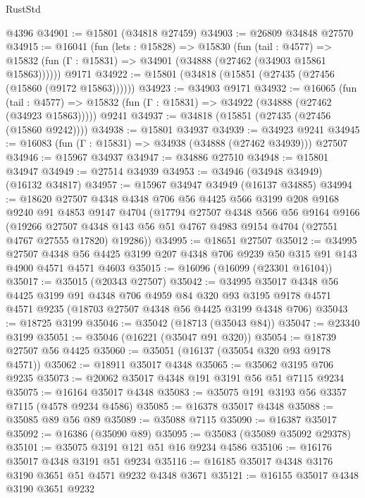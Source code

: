 \begin{lexlean}{RustStd}
\begin{coremodule}
    @4396
@34901 := @15801 (@34818 @27459)
@34903 := @26809 @34848 @27570
@34915 := @16041
    (fun (lets : @15828) =>
    @15830
      (fun (tail : @4577) =>
      @15832 (fun (Γ : @15831) => @34901 (@34888 (@27462 (@34903 @15861 @15863))))))
    @9171
@34922 := @15801 (@34818 (@15851 (@27435 (@27456 (@15860 (@9172 @15863))))))
@34923 := @34903 @9171
@34932 := @16065
    (fun (tail : @4577) => @15832 (fun (Γ : @15831) => @34922 (@34888 (@27462 (@34923 @15863)))))
    @9241
@34937 := @34818 (@15851 (@27435 (@27456 (@15860 @9242))))
@34938 := @15801 @34937
@34939 := @34923 @9241
@34945 := @16083 (fun (Γ : @15831) => @34938 (@34888 (@27462 @34939))) @27507
@34946 := @15967 @34937
@34947 := @34886 @27510
@34948 := @15801 @34947
@34949 := @27514 @34939
@34953 := @34946 (@34948 @34949) (@16132 @34817)
@34957 := @15967 @34947 @34949 (@16137 @34885)
@34994 := @18620
    @27507
    @4348
    @4348
    @706
    @56
    @4425
    @566
    @3199
    @208
    @9168
    @9240
    @91
    @4853
    @9147
    @4704
    (@17794
      @27507
      @4348
      @566
      @56
      @9164
      @9166
      (@19266
        @27507
        @4348
        @143
        @56
        @51
        @4767
        @4983
        @9154
        @4704
        (@27551 @4767 @27555 @17820)
        @19286))
@34995 := @18651 @27507
@35012 := @34995
    @27507
    @4348
    @56
    @4425
    @3199
    @207
    @4348
    @706
    @9239
    @50
    @315
    @91
    @143
    @4900
    @4571
    @4571
    @4603
@35015 := @16096 (@16099 (@23301 @16104))
@35017 := @35015 (@20343 @27507)
@35042 := @34995
    @35017
    @4348
    @56
    @4425
    @3199
    @91
    @4348
    @706
    @4959
    @84
    @320
    @93
    @3195
    @9178
    @4571
    @4571
    @9235
    (@18703 @27507 @4348 @56 @4425 @3199 @4348 @706)
@35043 := @18725 @3199
@35046 := @35042 (@18713 (@35043 @84))
@35047 := @23340 @3199
@35051 := @35046 (@16221 (@35047 @91 @320))
@35054 := @18739 @27507 @56 @4425
@35060 := @35051 (@16137 (@35054 @320 @93 @9178 @4571))
@35062 := @18911 @35017 @4348
@35065 := @35062 @3195 @706 @9235
@35073 := @20062 @35017 @4348 @191 @3191 @56 @51 @7115 @9234
@35075 := @16164 @35017 @4348
@35083 := @35075 @191 @3193 @56 @3357 @7115 (@4578 @9234 @4586)
@35085 := @16378 @35017 @4348
@35088 := @35085 @89 @56 @89
@35089 := @35088 @7115
@35090 := @16387 @35017
@35092 := @16386 (@35090 @89)
@35095 := @35083 (@35089 @35092 @29378)
@35101 := @35075 @3191 @121 @51 @16 @9234 @4586
@35106 := @16176 @35017 @4348 @3191 @51 @9234
@35116 := @16185 @35017 @4348 @3176 @3190 @3651 @51 @4571 @9232 @4348 @3671
@35121 := @16155 @35017 @4348 @3190 @3651 @9232

\end{coremodule}
\end{lexlean}
